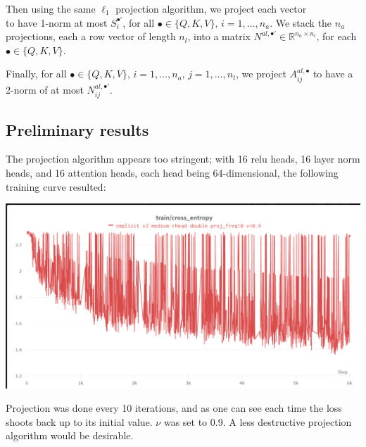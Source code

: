 \documentclass{article}
\begin{document}
Then using the same $\ell_1$ projection algorithm, we project each vector 
\begin{equation*}
[\|A^{al, \bullet}_{i1}\|_2,\;\ldots,\; \|A^{al,\bullet}_{in_l}\|_2]
\end{equation*}
to have 1-norm at most $S^{\bullet\prime}_i$, for all $\bullet\in\{Q,K,V\},\, i=1,\ldots, n_a$. We stack the $n_a$ 
projections, each a row vector of length $n_l$, into 
a matrix $N^{al, \bullet\prime}\in\mathbb R^{n_a\times n_l}$, for each $\bullet\in\{Q, K, V\}$.

Finally, for all $\bullet\in\{Q,K,V\},\, i=1,\ldots, n_a,\, j=1,\ldots, n_l$, we project $A^{al,\bullet}_{ij}$ to have a
2-norm of at most $N^{al, \bullet\prime}_{ij}$.
\subsection{Preliminary results}
The projection algorithm appears too stringent; with 16 relu heads, 16 layer norm heads, and 16 attention heads, each
head being 64-dimensional, the following training curve resulted: 
\begin{center}
\includegraphics[width=0.8\linewidth]{images/implicit_v2_1.png}
\end{center}
Projection was done every 10 iterations, and as one can see each time the loss shoots back up to its initial value. 
$\nu$ was set to 0.9. A less destructive projection algorithm would be desirable.


\end{document}
